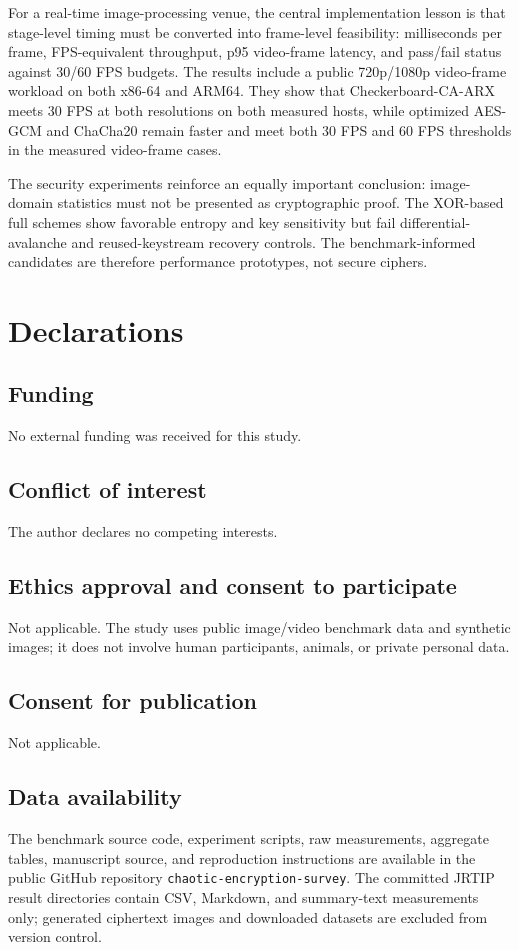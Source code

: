 \documentclass[twocolumn,runningheads]{svjour3}
\begin{document}
For a real-time image-processing venue, the central implementation lesson is
that stage-level timing must be converted into frame-level feasibility:
milliseconds per frame, FPS-equivalent throughput, p95 video-frame latency,
and pass/fail status against 30/60 FPS budgets. The results include a
public 720p/1080p video-frame workload on both x86-64 and ARM64. They show
that Checkerboard-CA-ARX meets 30 FPS at both resolutions on both measured
hosts, while optimized AES-GCM and ChaCha20 remain faster and meet both
30 FPS and 60 FPS thresholds in the measured video-frame cases.

The security experiments reinforce an equally important conclusion:
image-domain statistics must not be presented as cryptographic proof. The
XOR-based full schemes show favorable entropy and key sensitivity but fail
differential-avalanche and reused-keystream recovery controls. The
benchmark-informed candidates are therefore performance prototypes, not secure
ciphers.


\section*{Declarations}

\subsection*{Funding}
No external funding was received for this study.

\subsection*{Conflict of interest}
The author declares no competing interests.

\subsection*{Ethics approval and consent to participate}
Not applicable. The study uses public image/video benchmark data and synthetic images; it does not involve human participants, animals, or private personal data.

\subsection*{Consent for publication}
Not applicable.

\subsection*{Data availability}
The benchmark source code, experiment scripts, raw measurements, aggregate tables, manuscript source, and reproduction instructions are available in the public GitHub repository \texttt{chaotic-encryption-survey}. The committed JRTIP result directories contain CSV, Markdown, and summary-text measurements only; generated ciphertext images and downloaded datasets are excluded from version control.
\end{document}
